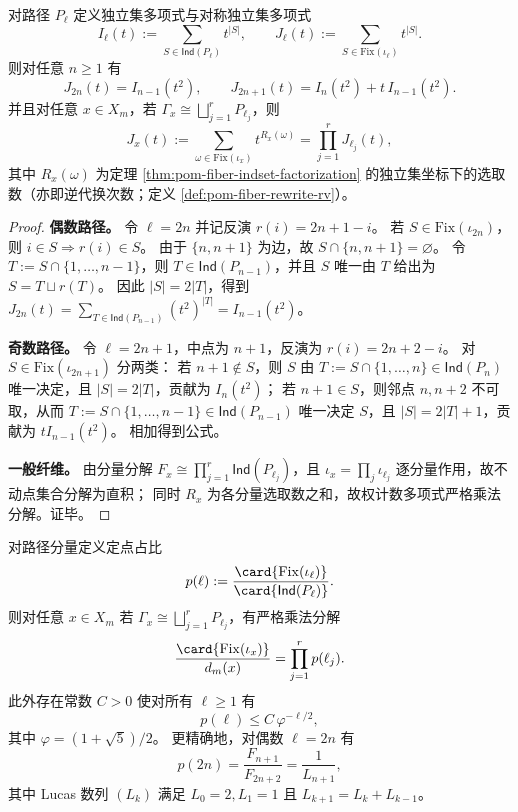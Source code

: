 \begin{proposition}[对称独立集多项式的闭式与分量乘法分解]\label{prop:pom-time-reversal-symmetric-indset-polynomial}
对路径 \(P_\ell\) 定义独立集多项式与对称独立集多项式
\[
I_\ell(t):=\sum_{S\in \mathsf{Ind}(P_\ell)}t^{|S|},
\qquad
J_\ell(t):=\sum_{S\in \mathrm{Fix}(\iota_\ell)}t^{|S|}.
\]
则对任意 \(n\ge 1\) 有
\[
J_{2n}(t)=I_{n-1}(t^2),
\qquad
J_{2n+1}(t)=I_{n}(t^2)+t\,I_{n-1}(t^2).
\]
并且对任意 \(x\in X_m\)，若 \(\Gamma_x\cong\bigsqcup_{j=1}^r P_{\ell_j}\)，则
\[
J_x(t):=\sum_{\omega\in \mathrm{Fix}(\iota_x)} t^{R_x(\omega)}
=\prod_{j=1}^r J_{\ell_j}(t),
\]
其中 \(R_x(\omega)\) 为定理 \ref{thm:pom-fiber-indset-factorization} 的独立集坐标下的选取数（亦即逆代换次数；定义 \ref{def:pom-fiber-rewrite-rv}）。
\end{proposition}

\begin{proof}
\textbf{偶数路径。}
令 \(\ell=2n\) 并记反演 \(r(i)=2n+1-i\)。
若 \(S\in\mathrm{Fix}(\iota_{2n})\)，则 \(i\in S\Rightarrow r(i)\in S\)。
由于 \(\{n,n+1\}\) 为边，故 \(S\cap\{n,n+1\}=\varnothing\)。
令 \(T:=S\cap\{1,\dots,n-1\}\)，则 \(T\in\mathsf{Ind}(P_{n-1})\)，并且 \(S\) 唯一由 \(T\) 给出为 \(S=T\sqcup r(T)\)。
因此 \(|S|=2|T|\)，得到 \(J_{2n}(t)=\sum_{T\in\mathsf{Ind}(P_{n-1})}(t^2)^{|T|}=I_{n-1}(t^2)\)。
\par
\textbf{奇数路径。}
令 \(\ell=2n+1\)，中点为 \(n+1\)，反演为 \(r(i)=2n+2-i\)。
对 \(S\in\mathrm{Fix}(\iota_{2n+1})\) 分两类：
若 \(n+1\notin S\)，则 \(S\) 由 \(T:=S\cap\{1,\dots,n\}\in\mathsf{Ind}(P_n)\) 唯一决定，且 \(|S|=2|T|\)，贡献为 \(I_n(t^2)\)；
若 \(n+1\in S\)，则邻点 \(n,n+2\) 不可取，从而 \(T:=S\cap\{1,\dots,n-1\}\in\mathsf{Ind}(P_{n-1})\) 唯一决定 \(S\)，且 \(|S|=2|T|+1\)，贡献为 \(tI_{n-1}(t^2)\)。
相加得到公式。
\par
\textbf{一般纤维。}
由分量分解 \(F_x\cong \prod_{j=1}^r \mathsf{Ind}(P_{\ell_j})\)，且 \(\iota_x=\prod_j \iota_{\ell_j}\) 逐分量作用，故不动点集合分解为直积；
同时 \(R_x\) 为各分量选取数之和，故权计数多项式严格乘法分解。证毕。
\end{proof}

\begin{proposition}[时间反演定点占比的乘法律与指数稀疏]\label{prop:pom-time-reversal-fixedpoint-ratio-decay}
对路径分量定义定点占比
\[
p(\ell):=\frac{\card{\mathrm{Fix}(\iota_\ell)}}{\card{\mathsf{Ind}(P_\ell)}}.
\]
则对任意 \(x\in X_m\) 若 \(\Gamma_x\cong\bigsqcup_{j=1}^r P_{\ell_j}\)，有严格乘法分解
\[
\frac{\card{\mathrm{Fix}(\iota_x)}}{d_m(x)}=\prod_{j=1}^r p(\ell_j).
\]
此外存在常数 \(C>0\) 使对所有 \(\ell\ge 1\) 有
\[
p(\ell)\le C\,\varphi^{-\ell/2},
\]
其中 \(\varphi=(1+\sqrt5)/2\)。
更精确地，对偶数 \(\ell=2n\) 有
\[
p(2n)=\frac{F_{n+1}}{F_{2n+2}}=\frac{1}{L_{n+1}},
\]
其中 Lucas 数列 \((L_k)\) 满足 \(L_0=2,L_1=1\) 且 \(L_{k+1}=L_k+L_{k-1}\)。
\end{proposition}

